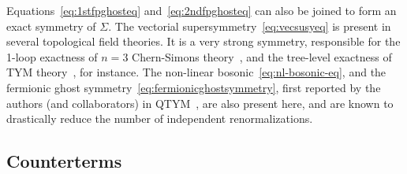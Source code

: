 \documentclass[../main.tex]{subfiles}
\begin{document}
Equations~\eqref{eq:1stfpghosteq} and~\eqref{eq:2ndfpghosteq} can also be joined to form an exact symmetry of $ \Sigma  $. The vectorial supersymmetry~\eqref{eq:vecsusyeq} is present in several topological field theories. It is a very strong symmetry, responsible for the 1-loop exactness of $ n=3 $ Chern-Simons theory~\cite{blasi1991a,maggiore1992a,piguet1995a}, and the tree-level exactness of TYM theory~\cite{brandhuber1994a,sadovski2017c,sadovski2018a}, for instance. The non-linear bosonic~\eqref{eq:nl-bosonic-eq}, and the fermionic ghost symmetry~\eqref{eq:fermionicghostsymmetry}, first reported by the authors (and collaborators) in QTYM~\cite{sadovski2017c}, are also present here, and are known to drastically reduce the number of independent renormalizations.

\subsection{Counterterms}%
\label{ssec:counterterm}
\end{document}
